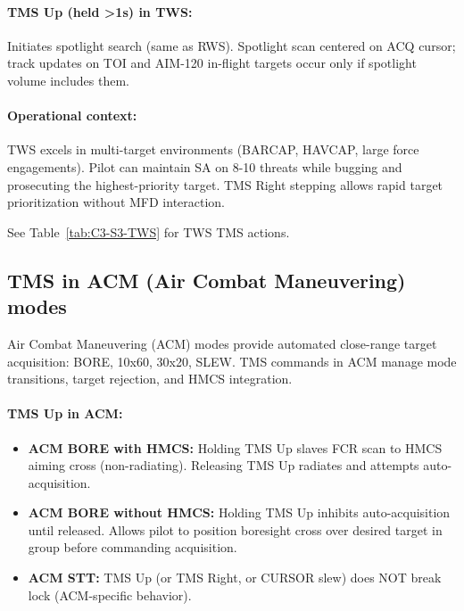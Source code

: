 \documentclass[11pt, a4paper, twoside]{report}
\begin{document}
\paragraph{TMS Up (held >1s) in TWS:}
Initiates spotlight search (same as RWS). Spotlight scan centered on ACQ cursor; track updates on TOI and AIM-120 in-flight targets occur only if spotlight volume includes them.

\paragraph{Operational context:}
TWS excels in multi-target environments (BARCAP, HAVCAP, large force engagements). Pilot can maintain SA on 8-10 threats while bugging and prosecuting the highest-priority target. TMS Right stepping allows rapid target prioritization without MFD interaction.

See Table~\ref{tab:C3-S3-TWS} for TWS TMS actions.

\subsection{TMS in ACM (Air Combat Maneuvering) modes}
\label{sec:C3-S3-S4}

Air Combat Maneuvering (ACM) modes provide automated close-range target acquisition: BORE, 10x60, 30x20, SLEW. TMS commands in ACM manage mode transitions, target rejection, and HMCS integration.

\paragraph{TMS Up in ACM:}
\begin{itemize}
    \item \textbf{ACM BORE with HMCS:} Holding TMS Up slaves FCR scan to HMCS aiming cross (non-radiating). Releasing TMS Up radiates and attempts auto-acquisition.
    \item \textbf{ACM BORE without HMCS:} Holding TMS Up inhibits auto-acquisition until released. Allows pilot to position boresight cross over desired target in group before commanding acquisition.
    \item \textbf{ACM STT:} TMS Up (or TMS Right, or CURSOR slew) does NOT break lock (ACM-specific behavior).
\end{itemize}
\end{document}
